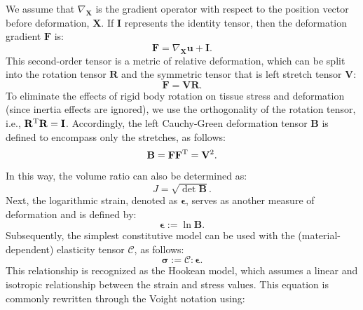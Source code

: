 \documentclass[12pt,a4paper]{report}
\begin{document}
We assume that $\nabla_\mathbf{X}$ is the gradient operator with respect to the position vector before deformation, $\mathbf{X}$. If $\mathbf{I}$ represents the identity tensor, then the deformation gradient $\mathbf{F}$ is:
%
\begin{equation}
    \mathbf{F} = \nabla_\mathbf{X} \mathbf{u} + \mathbf{I}.
\end{equation}
%
This second-order tensor is a metric of relative deformation, which can be split into the rotation tensor $\mathbf{R}$ and the symmetric tensor that is left stretch tensor $\mathbf{V}$:
%
\begin{equation}
    \mathbf{F} = \mathbf{V} \mathbf{R}. \label{eq1-1}
\end{equation}
%
To eliminate the effects of rigid body rotation on tissue stress and deformation (since inertia effects are ignored), we use the orthogonality of the rotation tensor, i.e., $\mathbf{R}^{\rm T}\mathbf{R} = \mathbf{I}$. Accordingly, the left Cauchy-Green deformation tensor $\mathbf{B}$ is defined to encompass only the stretches, as follows:
%
\begin{equation}
\mathbf{B} = \mathbf{F} \mathbf{F}^{\rm T} = \mathbf{V}^2.
\end{equation}
%
In this way, the volume ratio can also be determined as:
%
\begin{equation}
J = \sqrt{\det \mathbf{B}}.
\end{equation}
%
Next, the logarithmic strain, denoted as $\bm{\epsilon}$, serves as another measure of deformation and is defined by:
%
\begin{equation}
\bm{\epsilon} := \ln \mathbf{B}.
\end{equation}
%
Subsequently, the simplest constitutive model can be used with the (material-dependent) elasticity tensor $\mathcal{C}$, as follows:
%
\begin{equation}\label{eq-isotropic_elastic}
\bm{\sigma} := \mathcal{C} : \bm{\epsilon}.
\end{equation}
%
This relationship is recognized as the Hookean model, which assumes a linear and isotropic relationship between the strain and stress values. This equation is commonly rewritten through the Voight notation using:
%
\end{document}
